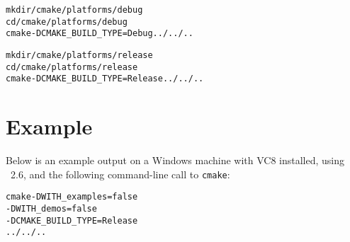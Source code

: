 {\ccTexHtml{\scriptsize}{}
\begin{alltt}
mkdir \cgalrel/cmake/platforms/debug
cd \cgalrel/cmake/platforms/debug
cmake -DCMAKE_BUILD_TYPE=Debug ../../..

mkdir \cgalrel/cmake/platforms/release
cd \cgalrel/cmake/platforms/release
cmake -DCMAKE_BUILD_TYPE=Release ../../..
\end{alltt}
}

\section{Example} 


Below is an example output on a Windows machine with VC8 installed, using \cmake\ 2.6,
and the following command-line call to \texttt{cmake}:

{\ccTexHtml{\scriptsize}{}
\begin{alltt}
cmake -DWITH_examples=false 
      -DWITH_demos=false 
      -DCMAKE_BUILD_TYPE=Release 
      ../../..
\end{alltt}
}


